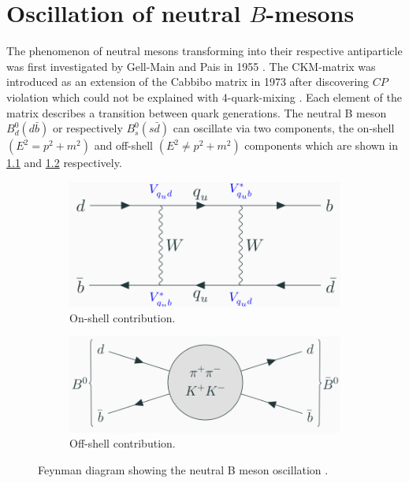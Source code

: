 \chapter{Oscillation of neutral $B$-mesons}

The phenomenon of neutral mesons transforming into their respective antiparticle was first investigated by Gell-Main and Pais in 1955 \cite{PhysRev.97.1387}.
The CKM-matrix was introduced as an extension of the Cabbibo matrix in 1973 after discovering $CP$ violation which could not be explained with 4-quark-mixing \cite{10.1143/PTP.49.652}.
Each element of the matrix describes a transition between quark generations.
The neutral B meson $B^0_d(d\bar b)$ or respectively $B^0_s(s\bar d)$ can oscillate via two components, the on-shell $(E^2= p^2+m^2)$ and off-shell $(E^2\neq p^2+m^2)$ components which are shown in \ref{fig:feynmanOnshell} and \ref{fig:feynmanOffshell} respectively.
\begin{figure}
    \centering
    \begin{subfigure}[B]{.5\textwidth}   %
        \centering
        \includegraphics[width=.8\textwidth]{figs/feynmanOnshell.png}
        \caption{On-shell contribution.}
        \label{fig:feynmanOnshell}
    \end{subfigure}
    \begin{subfigure}[B]{.45\textwidth}   %
        \centering
        \includegraphics[width=.8\textwidth]{figs/feynmanOffshell.png}
        \caption{Off-shell contribution.}
        \label{fig:feynmanOffshell}
    \end{subfigure}
    \caption{Feynman diagram showing the neutral B meson oscillation \cite{Kpopp}.}
    \label{fig:feynmanDiagram}
\end{figure}
